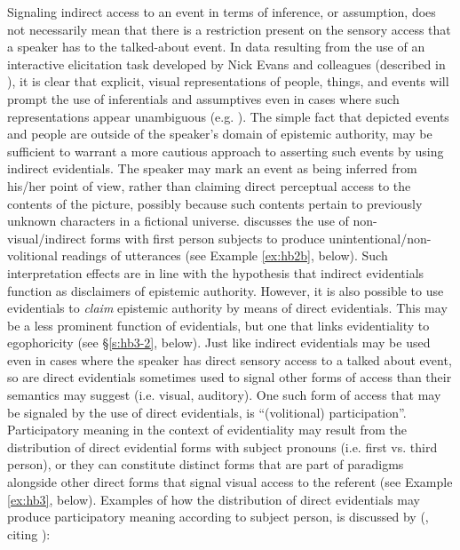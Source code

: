 \documentclass[output=paper]{langsci/langscibook}
\begin{document}
Signaling indirect access to an event in terms of inference, or assumption, does not necessarily mean that there is a restriction present on the sensory access that a speaker has to the talked-about event. In data resulting from the use of an interactive elicitation task developed by Nick Evans and colleagues (described in \citealt{SanRoqueetal2012}), it is clear that explicit, visual representations of people, things, and events will prompt the use of inferentials and assumptives even in cases where such representations appear unambiguous (e.g. \citealt{Quartararo2017}). The simple fact that depicted events and people are outside of the speaker’s domain of epistemic authority, may be sufficient to warrant a more cautious approach to asserting such events by using indirect evidentials. The speaker may mark an event as being inferred from his/her point of view, rather than claiming direct perceptual access to the contents of the picture, possibly because such contents pertain to previously unknown characters in a fictional universe. 
\cite{Curnow2003} discusses the use of non-visual/indirect forms with first person subjects to produce unintentional/non-volitional readings of utterances (see Example \ref{ex:hb2b}, below). Such interpretation effects are in line with the hypothesis that indirect evidentials function as disclaimers of epistemic authority. However, it is also possible to use evidentials to \emph{claim} epistemic authority by means of direct evidentials. This may be a less prominent function of evidentials, but one that links evidentiality to egophoricity (see §\ref{s:hb3-2}, below). Just like indirect evidentials may be used even in cases where the speaker has direct sensory access to a talked about event, so are direct evidentials sometimes used to signal other forms of access than their semantics may suggest (i.e. visual, auditory). One such form of access that may be signaled by the use of direct evidentials, is “(volitional) participation”. Participatory meaning in the context of evidentiality may result from the distribution of direct evidential forms with subject pronouns (i.e. first vs. third person), or they can constitute distinct forms that are part of paradigms alongside other direct forms that signal visual access to the referent (see Example \ref{ex:hb3}, below). Examples of how the distribution of direct evidentials may produce participatory meaning according to subject person, is discussed by \citeauthor{Curnow2002} (\citeyear[188--190]{Curnow2002}, citing \citealt[133]{Ramirez1997}): 
\end{document}
